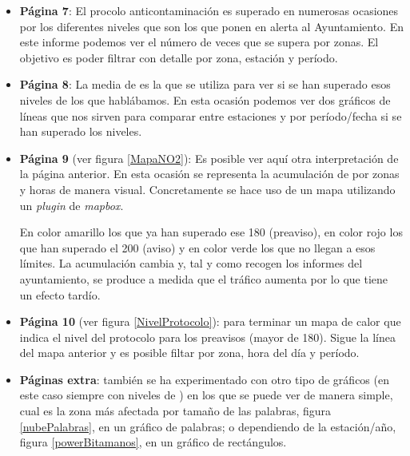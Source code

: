 \begin{itemize}
	\item \textbf{Página 7}: El procolo anticontaminación es superado en numerosas ocasiones por los diferentes niveles que son los que ponen en alerta al Ayuntamiento. En este informe podemos ver el número de veces que se supera por zonas. El objetivo es poder filtrar con detalle por zona, estación y período.  
	
	\item \textbf{Página 8}: La media de  es la que se utiliza para ver si se han superado esos niveles de los que hablábamos. En esta ocasión podemos ver dos gráficos de líneas que nos sirven para comparar entre estaciones y por período/fecha si se han superado los niveles.
	
	\item \textbf{Página 9} (ver figura \ref{MapaNO2}): Es posible ver aquí otra interpretación de la página anterior. En esta ocasión se representa la  acumulación de  por zonas y horas de manera visual. Concretamente se hace uso de un mapa utilizando un \textit{plugin} de \textit{mapbox}. 
	
	En color amarillo los que ya han superado ese 180 (preaviso), en color rojo los que han superado el 200 (aviso) y en color verde los que no llegan a esos límites. La acumulación cambia y, tal y como recogen los informes del ayuntamiento, se produce a medida que el tráfico aumenta por lo que tiene un efecto tardío.
	
	
	\item \textbf{Página 10} (ver figura \ref{NivelProtocolo}): para terminar un mapa de calor que indica el nivel del protocolo para los preavisos (mayor de 180). Sigue la línea del mapa anterior y es posible filtar por zona, hora del día y período.
	
	
	\item \textbf{Páginas extra}: también se ha experimentado con otro tipo de gráficos (en este caso siempre con niveles de ) en los que se puede ver de manera simple, cual es la zona más afectada por tamaño de las palabras, figura \ref{nubePalabras}, en un gráfico de palabras; o dependiendo de la estación/año, figura \ref{powerBitamanos}, en un gráfico de rectángulos. 
	
	
	
	
\end{itemize}


